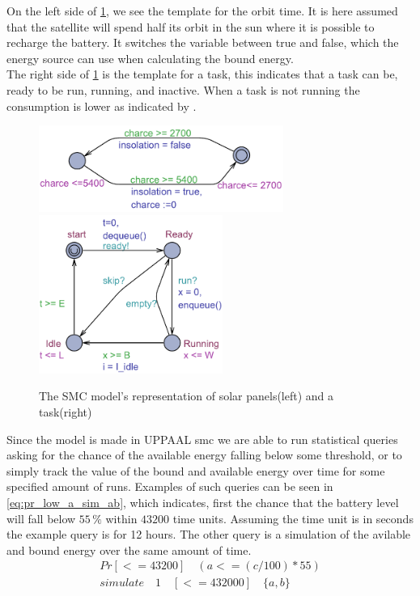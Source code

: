 On the left side of \cref{fig:solar_task}, we see the template for the orbit time. It is here assumed that the satellite will spend half its orbit in the sun where it is possible to recharge the battery. It switches the variable  between true and false, which the energy source can use when calculating the bound energy.\\
The right side of \cref{fig:solar_task} is the template for a task, this indicates that a task can be, ready to be run, running, and inactive. When a task is not running the consumption is lower as indicated by .

\begin{figure}[H]%
	\centering
	\subfloat
	{{\includegraphics[width=8cm]{graphics/smc_solar.pdf} }}%
	\qquad
	\subfloat
	{{\includegraphics[width=6cm]{graphics/smc_task.pdf} }}%
	\caption{The SMC model's representation of solar panels(left) and a task(right)}%
	\label{fig:solar_task}%
\end{figure}
Since the model is made in UPPAAL \gls{smc} we are able to run statistical queries asking for the chance of the available energy falling below some threshold, or to simply track the value of the bound and available energy over time for some specified amount of runs. Examples of such queries can be seen in \cref{eq:pr_low_a_sim_ab}, which indicates, first the chance that the battery level will fall below $55\, \%$ within $43200$ time units. Assuming the time unit is in seconds the example query is for 12 hours. The other query is a simulation of the avilable and bound energy over the same amount of time.\\

\begin{align}
Pr[<= 43200] \quad(a <= (c/100)*55)		\nonumber \\
simulate \quad 1 \quad [<=432000] \quad \{a,b\} 
\label{eq:pr_low_a_sim_ab}
\end{align}


